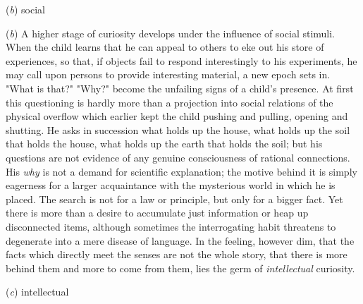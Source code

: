 \documentclass[letterpaper]{book}
\begin{document}
(\emph{b}) social

(\emph{b}) A higher stage of curiosity develops under the influence of
social stimuli. When the child learns that he can appeal to others to
eke out his store of experiences, so that, if objects fail to respond
interestingly to his experiments, he may call upon persons to provide
interesting material, a new epoch sets in. "What is that?" "Why?" become
the unfailing signs of a child's presence. At first this questioning is
hardly more than a projection into social relations of the physical
overflow which earlier kept the child pushing and pulling, opening and
shutting. He asks in succession what holds up the house, what holds up
the soil that holds the house, what holds up the earth that holds the
soil; but his questions are not evidence of any genuine consciousness of
rational connections. His \emph{why} is not a demand for scientific
explanation; the motive behind it is simply eagerness for a larger
acquaintance with the mysterious world in which he is placed. The search
is not for a law or principle, but only for a bigger fact. Yet there is
more than a desire to accumulate just information or heap up
disconnected items, although sometimes the interrogating habit threatens
to degenerate into a mere disease of language. In the feeling, however
dim, that the facts which directly meet the senses are not the whole
story, that there is more behind them and more to come from them, lies
the germ of \emph{intellectual} curiosity.

(\emph{c}) intellectual
\end{document}
